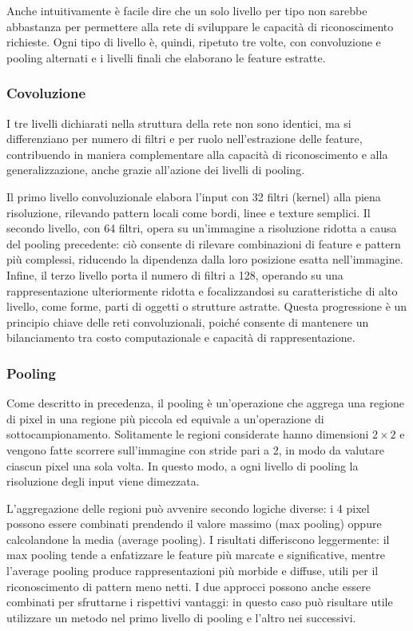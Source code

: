 \documentclass[a4paper,12pt]{article}
\begin{document}
Anche intuitivamente è facile dire che un solo livello per tipo non sarebbe abbastanza per permettere alla rete di sviluppare le capacità di riconoscimento richieste. Ogni tipo di livello è, quindi, ripetuto tre volte, con convoluzione e pooling alternati e i livelli finali che elaborano le feature estratte.

\subsubsection{Covoluzione}
I tre livelli dichiarati nella struttura della rete non sono identici, ma si differenziano per numero di filtri e per ruolo nell'estrazione delle feature, contribuendo in maniera complementare alla capacità di riconoscimento e alla generalizzazione, anche grazie all'azione dei livelli di pooling.

Il primo livello convoluzionale elabora l'input con 32 filtri (kernel) alla piena risoluzione, rilevando pattern locali come bordi, linee e texture semplici.
Il secondo livello, con 64 filtri, opera su un'immagine a risoluzione ridotta a causa del pooling precedente: ciò consente di rilevare combinazioni di feature e pattern più complessi, riducendo la dipendenza dalla loro posizione esatta nell'immagine.
Infine, il terzo livello porta il numero di filtri a 128, operando su una rappresentazione ulteriormente ridotta e focalizzandosi su caratteristiche di alto livello, come forme, parti di oggetti o strutture astratte.
Questa progressione è un principio chiave delle reti convoluzionali, poiché consente di mantenere un bilanciamento tra costo computazionale e capacità di rappresentazione.

\subsubsection{Pooling}
Come descritto in precedenza, il pooling è un'operazione che aggrega una regione di pixel in una regione più piccola ed equivale a un'operazione di sottocampionamento. Solitamente le regioni considerate hanno dimensioni $2 \times 2$ e vengono fatte scorrere sull'immagine con stride pari a 2, in modo da valutare ciascun pixel una sola volta. In questo modo, a ogni livello di pooling la risoluzione degli input viene dimezzata.

L'aggregazione delle regioni può avvenire secondo logiche diverse: i 4 pixel possono essere combinati prendendo il valore massimo (max pooling) oppure calcolandone la media (average pooling). I risultati differiscono leggermente: il max pooling tende a enfatizzare le feature più marcate e significative, mentre l'average pooling produce rappresentazioni più morbide e diffuse, utili per il riconoscimento di pattern meno netti.
I due approcci possono anche essere combinati per sfruttarne i rispettivi vantaggi: in questo caso può risultare utile utilizzare un metodo nel primo livello di pooling e l'altro nei successivi.
\end{document}
